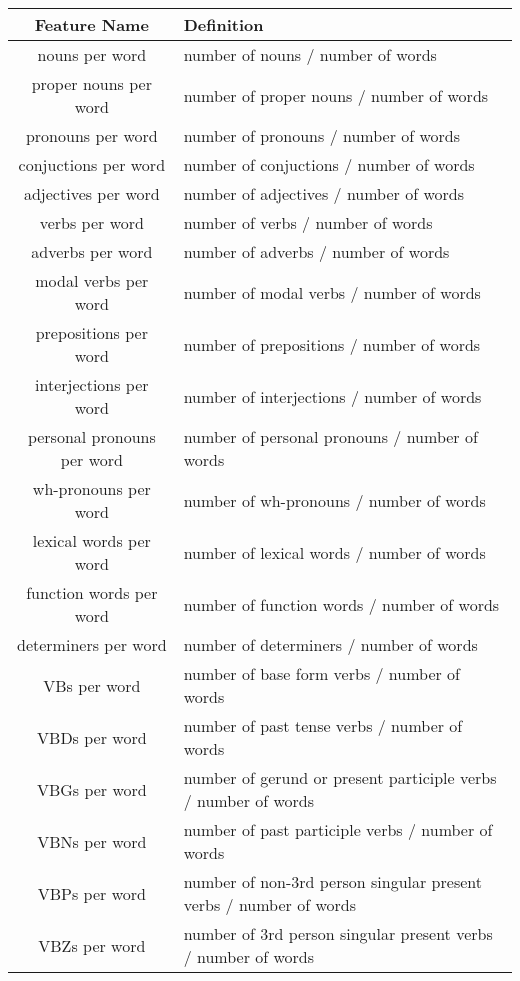 \documentclass[11pt,a4paper]{article}
\theoremstyle{definition}
\begin{document}
\begin{table}
\centering
\begin{tabular}{|c|p{10cm}|}
\hline
\textbf{Feature Name} & \textbf{Definition} \\\hline
nouns per word & number of nouns / number of words \\\hline
proper nouns per word & number of proper nouns / number of words \\\hline
pronouns per word & number of pronouns / number of words \\\hline
conjuctions per word & number of conjuctions / number of words \\\hline
adjectives per word & number of adjectives / number of words \\\hline
verbs per word & number of verbs / number of words \\\hline
adverbs per word & number of adverbs / number of words \\\hline
modal verbs per word & number of modal verbs / number of words \\\hline
prepositions per word & number of prepositions / number of words \\\hline
interjections per word & number of interjections / number of words \\\hline
personal pronouns per word & number of personal pronouns / number of words \\\hline
wh-pronouns per word & number of wh-pronouns / number of words \\\hline
lexical words per word & number of lexical words / number of words \\\hline
function words per word & number of function words / number of words \\\hline
determiners per word & number of determiners / number of words \\\hline
VBs per word & number of base form verbs / number of words \\\hline
VBDs per word & number of past tense verbs / number of words \\\hline
VBGs per word & number of gerund or present participle verbs / number of words \\\hline
VBNs per word & number of past participle verbs / number of words \\\hline
VBPs per word & number of non-3rd person singular present verbs / number of words \\\hline
VBZs per word & number of 3rd person singular present verbs / number of words \\\hline

\end{tabular}
\end{table}
\end{document}
